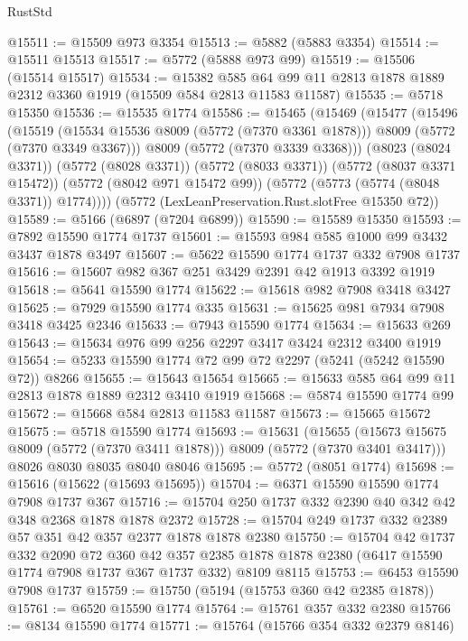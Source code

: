 \begin{lexlean}{RustStd}
\begin{coremodule}
{\begin{coremodule}
{{{{{{{{{{{{{{{{{{{{{{{{{{{{{@15511 := @15509 @973 @3354
@15513 := @5882 (@5883 @3354)
@15514 := @15511 @15513
@15517 := @5772 (@5888 @973 @99)
@15519 := @15506 (@15514 @15517)
@15534 := @15382
    @585
    @64
    @99
    @11
    @2813
    @1878
    @1889
    @2312
    @3360
    @1919
    (@15509 @584 @2813 @11583 @11587)
@15535 := @5718 @15350
@15536 := @15535 @1774
@15586 := @15465
    (@15469
      (@15477
        (@15496
          (@15519
            (@15534 @15536 @8009 (@5772 (@7370 @3361 @1878)))
            @8009
            (@5772 (@7370 @3349 @3367)))
          @8009
          (@5772 (@7370 @3339 @3368)))
        (@8023 (@8024 @3371))
        (@5772 (@8028 @3371))
        (@5772 (@8033 @3371))
        (@5772 (@8037 @3371 @15472))
        (@5772 (@8042 @971 @15472 @99))
        (@5772 (@5773 (@5774 (@8048 @3371)) @1774))))
    (@5772 (LexLeanPreservation.Rust.slotFree @15350 @72))
@15589 := @5166 (@6897 (@7204 @6899))
@15590 := @15589 @15350
@15593 := @7892 @15590 @1774 @1737
@15601 := @15593 @984 @585 @1000 @99 @3432 @3437 @1878 @3497
@15607 := @5622 @15590 @1774 @1737 @332 @7908 @1737
@15616 := @15607 @982 @367 @251 @3429 @2391 @42 @1913 @3392 @1919
@15618 := @5641 @15590 @1774
@15622 := @15618 @982 @7908 @3418 @3427
@15625 := @7929 @15590 @1774 @335
@15631 := @15625 @981 @7934 @7908 @3418 @3425 @2346
@15633 := @7943 @15590 @1774
@15634 := @15633 @269
@15643 := @15634 @976 @99 @256 @2297 @3417 @3424 @2312 @3400 @1919
@15654 := @5233 @15590 @1774 @72 @99 @72 @2297 (@5241 (@5242 @15590 @72)) @8266
@15655 := @15643 @15654
@15665 := @15633 @585 @64 @99 @11 @2813 @1878 @1889 @2312 @3410 @1919
@15668 := @5874 @15590 @1774 @99
@15672 := @15668 @584 @2813 @11583 @11587
@15673 := @15665 @15672
@15675 := @5718 @15590 @1774
@15693 := @15631
    (@15655 (@15673 @15675 @8009 (@5772 (@7370 @3411 @1878))) @8009 (@5772 (@7370 @3401 @3417)))
    @8026
    @8030
    @8035
    @8040
    @8046
@15695 := @5772 (@8051 @1774)
@15698 := @15616 (@15622 (@15693 @15695))
@15704 := @6371 @15590 @15590 @1774 @7908 @1737 @367
@15716 := @15704 @250 @1737 @332 @2390 @40 @342 @42 @348 @2368 @1878 @1878 @2372
@15728 := @15704 @249 @1737 @332 @2389 @57 @351 @42 @357 @2377 @1878 @1878 @2380
@15750 := @15704
    @42
    @1737
    @332
    @2090
    @72
    @360
    @42
    @357
    @2385
    @1878
    @1878
    @2380
    (@6417 @15590 @1774 @7908 @1737 @367 @1737 @332)
    @8109
    @8115
@15753 := @6453 @15590 @7908 @1737
@15759 := @15750 (@5194 (@15753 @360 @42 @2385 @1878))
@15761 := @6520 @15590 @1774
@15764 := @15761 @357 @332 @2380
@15766 := @8134 @15590 @1774
@15771 := @15764 (@15766 @354 @332 @2379 @8146)
}}}}}}}}}}}}}}}}}}}}}}}}}}}}}
\end{coremodule}}
\end{coremodule}
\end{lexlean}
